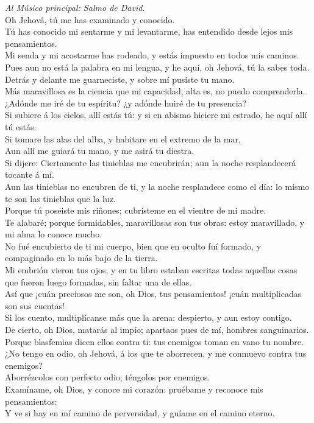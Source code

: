  \emph{Al Músico principal: Salmo de David.}\\
Oh Jehová, tú me has examinado y conocido.\\
 Tú has conocido mi sentarme y mi levantarme, has entendido
desde lejos mis pensamientos.\\
 Mi senda y mi acostarme has rodeado, y estás impuesto en
todos mis caminos.\\
 Pues aun no está la palabra en mi lengua, y he aquí, oh
Jehová, tú la sabes toda.\\
 Detrás y delante me guarneciste, y sobre mí pusiste tu
mano.\\
 Más maravillosa es la ciencia que mi capacidad; alta es, no
puedo comprenderla.\\
 ¿Adónde me iré de tu espíritu? ¿y adónde huiré de tu
presencia?\\
 Si subiere á los cielos, allí estás tú: y si en abismo
hiciere mi estrado, he aquí allí tú estás.\\
 Si tomare las alas del alba, y habitare en el extremo de la
mar,\\
 Aun allí me guiará tu mano, y me asirá tu diestra.\\
 Si dijere: Ciertamente las tinieblas me encubrirán; aun la
noche resplandecerá tocante á mí.\\
 Aun las tinieblas no encubren de ti, y la noche
resplandece como el día: lo mismo te son las tinieblas que la luz.\\
 Porque tú poseiste mis riñones; cubrísteme en el vientre
de mi madre.\\
 Te alabaré; porque formidables, maravillosas son tus
obras: estoy maravillado, y mi alma lo conoce mucho.\\
 No fué encubierto de ti mi cuerpo, bien que en oculto fuí
formado, y compaginado en lo más bajo de la tierra.\\
 Mi embrión vieron tus ojos, y en tu libro estaban escritas
todas aquellas cosas que fueron luego formadas, sin faltar una de
ellas.\\
 Así que ¡cuán preciosos me son, oh Dios, tus pensamientos!
¡cuán multiplicadas son sus cuentas!\\
 Si los cuento, multiplícanse más que la arena: despierto,
y aun estoy contigo.\\
 De cierto, oh Dios, matarás al impío; apartaos pues de mí,
hombres sanguinarios.\\
 Porque blasfemias dicen ellos contra ti: tus enemigos
toman en vano tu nombre.\\
 ¿No tengo en odio, oh Jehová, á los que te aborrecen, y me
conmuevo contra tus enemigos?\\
 Aborrézcolos con perfecto odio; téngolos por enemigos.\\
 Examíname, oh Dios, y conoce mi corazón: pruébame y
reconoce mis pensamientos:\\
 Y ve si hay en mí camino de perversidad, y guíame en el
camino eterno.

